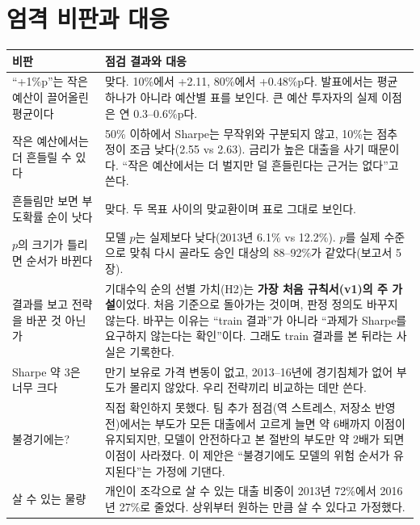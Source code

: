 \documentclass[11pt]{report}
\begin{document}
\section{엄격 비판과 대응}
\begin{table}[H]\centering\small
\begin{tabularx}{\linewidth}{@{}QL@{}}\toprule
비판 & 점검 결과와 대응\\\midrule
``+1\%p''는 작은 예산이 끌어올린 평균이다 & 맞다. 10\%에서 +2.11, 80\%에서 +0.48\%p다. 발표에서는 평균 하나가 아니라 예산별 표를 보인다. 큰 예산 투자자의 실제 이점은 연 0.3--0.6\%p다.\\
작은 예산에서는 더 흔들릴 수 있다 & 50\% 이하에서 Sharpe는 무작위와 구분되지 않고, 10\%는 점추정이 조금 낮다(2.55 vs 2.63). 금리가 높은 대출을 사기 때문이다. ``작은 예산에서는 더 벌지만 덜 흔들린다는 근거는 없다''고 쓴다.\\
흔들림만 보면 부도확률 순이 낫다 & 맞다. 두 목표 사이의 맞교환이며 표로 그대로 보인다.\\
$p$의 크기가 틀리면 순서가 바뀐다 & 모델 $p$는 실제보다 낮다(2013년 6.1\% vs 12.2\%). $p$를 실제 수준으로 맞춰 다시 골라도 승인 대상의 88--92\%가 같았다(보고서 5장).\\
결과를 보고 전략을 바꾼 것 아닌가 & 기대수익 순의 선별 가치(H2)는 \textbf{가장 처음 규칙서(v1)의 주 가설}이었다. 처음 기준으로 돌아가는 것이며, 판정 정의도 바꾸지 않는다. 바꾸는 이유는 ``train 결과''가 아니라 ``과제가 Sharpe를 요구하지 않는다는 확인''이다. 그래도 train 결과를 본 뒤라는 사실은 기록한다.\\
Sharpe 약 3은 너무 크다 & 만기 보유로 가격 변동이 없고, 2013--16년에 경기침체가 없어 부도가 몰리지 않았다. 우리 전략끼리 비교하는 데만 쓴다.\\
불경기에는? & 직접 확인하지 못했다. 팀 추가 점검(역 스트레스, 저장소 반영 전)에서는 부도가 모든 대출에서 고르게 늘면 약 6배까지 이점이 유지되지만, 모델이 안전하다고 본 절반의 부도만 약 2배가 되면 이점이 사라졌다. 이 제안은 ``불경기에도 모델의 위험 순서가 유지된다''는 가정에 기댄다.\\
살 수 있는 물량 & 개인이 조각으로 살 수 있는 대출 비중이 2013년 72\%에서 2016년 27\%로 줄었다. 상위부터 원하는 만큼 살 수 있다고 가정했다.\\\bottomrule
\end{tabularx}
\end{table}
\end{document}
